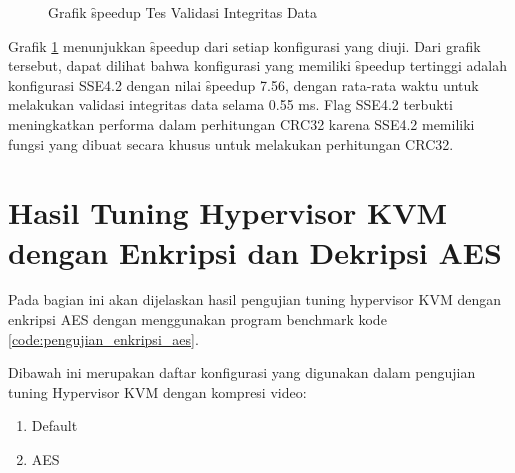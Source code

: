 \begin{figure}
    \centering
    \caption{Grafik \f{speedup} Tes Validasi Integritas Data}
    \label{fig:file_integrity_test_graph}
\end{figure}

Grafik \ref{fig:file_integrity_test_graph} menunjukkan \f{speedup} dari setiap konfigurasi yang diuji. Dari grafik tersebut, dapat dilihat bahwa konfigurasi yang memiliki \f{speedup} tertinggi adalah konfigurasi SSE4.2 dengan nilai \f{speedup} 7.56, dengan rata-rata waktu untuk melakukan validasi integritas data selama 0.55 ms. Flag SSE4.2 terbukti meningkatkan performa dalam perhitungan CRC32 karena SSE4.2 memiliki fungsi yang dibuat secara khusus untuk melakukan perhitungan CRC32.

\section{Hasil Tuning Hypervisor KVM dengan Enkripsi dan Dekripsi AES}
Pada bagian ini akan dijelaskan hasil pengujian tuning hypervisor KVM dengan enkripsi AES dengan menggunakan program benchmark kode \ref{code:pengujian_enkripsi_aes}.

Dibawah ini merupakan daftar konfigurasi yang digunakan dalam pengujian tuning Hypervisor KVM dengan kompresi video:

\begin{enumerate}
    \item Default
    \item AES
\end{enumerate}

